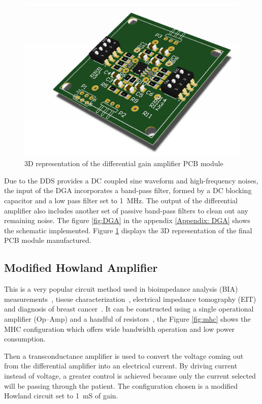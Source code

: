 \begin{figure}[!htpb]
	\centering
	\includegraphics[width=7.5 cm,keepaspectratio]{figure_DGA}
	\caption{3D representation of the differential gain amplifier PCB module}
	\label{fig:3D DGA}
\end{figure}

Due to the DDS provides a DC coupled sine waveform and high-frequency noises, the input of the DGA incorporates a band-pass filter, formed by a DC blocking capacitor and a low pass filter set to \SI{1}{\mega\hertz}. The output of the differential amplifier also includes another set of passive band-pass filters to clean out any remaining noise. The figure \ref{fig:DGA} in the appendix \ref{Appendix: DGA} shows the schematic implemented. Figure \ref{fig:3D DGA} displays the 3D representation of the final PCB module manufactured.

\subsection{Modified Howland Amplifier}
This is a very popular circuit method used in bioimpedance analysis (BIA) measurements~\cite{aroom2009bioimpedance}, tissue characterization~\cite{bertemes2002tissue,ross2003current}, electrical impedance tomography (EIT) and diagnosis of breast cancer~\cite{zou2003review,saulnier2007electrical}. It can be constructed using a single operational amplifier (Op–Amp) and a handful of resistors~\cite{sheingold1964impedance}, the Figure \ref{fig:mhc} shows the MHC configuration which offers wide bandwidth operation and low power consumption. 

Then a transconductance amplifier is used to convert the voltage coming out from the differential amplifier into an electrical current. By driving current instead of voltage, a greater control is achieved because only the current selected will be passing through the patient. The configuration chosen is a modified Howland circuit set to \SI{1}{\milli\siemens} of gain.

